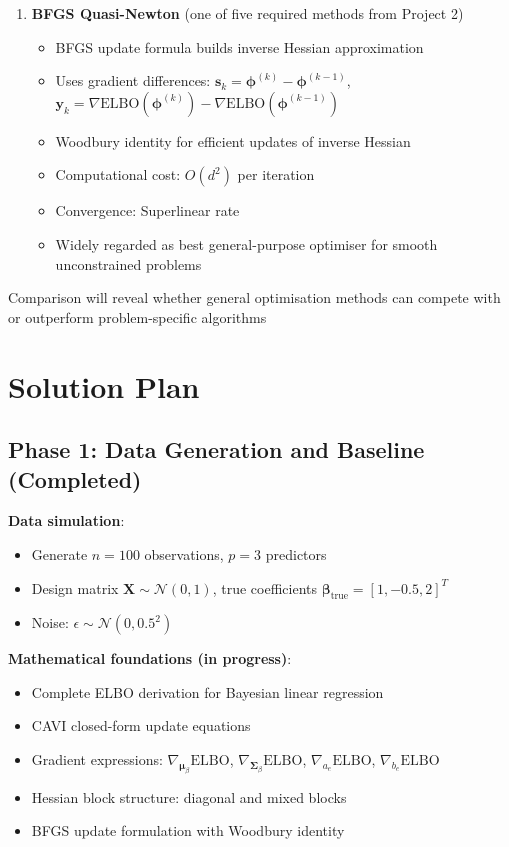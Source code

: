 \documentclass[11pt]{article}
\newcommand{\N}{\mathcal{N}}
\newcommand{\ELBO}{\text{ELBO}}
\begin{document}
\begin{enumerate}[leftmargin=*]
\item \textbf{BFGS Quasi-Newton} (one of five required methods from Project 2)
\begin{itemize}
\item BFGS update formula builds inverse Hessian approximation
\item Uses gradient differences: $\bm{s}_k = \bm{\phi}^{(k)} - \bm{\phi}^{(k-1)}$, $\bm{y}_k = \nabla \ELBO(\bm{\phi}^{(k)}) - \nabla \ELBO(\bm{\phi}^{(k-1)})$
\item Woodbury identity for efficient updates of inverse Hessian
\item Computational cost: $O(d^2)$ per iteration
\item Convergence: Superlinear rate
\item Widely regarded as best general-purpose optimiser for smooth unconstrained problems
\end{itemize}
\end{enumerate}


Comparison will reveal whether general optimisation methods can compete with or outperform problem-specific algorithms

\section*{Solution Plan}

\subsection*{Phase 1: Data Generation and Baseline (Completed)}

\textbf{Data simulation}:
\begin{itemize}
\item Generate $n = 100$ observations, $p = 3$ predictors
\item Design matrix $\bm{X} \sim \N(0, 1)$, true coefficients $\bm{\beta}_{\text{true}} = [1, -0.5, 2]^T$
\item Noise: $\epsilon \sim \N(0, 0.5^2)$
\end{itemize}

\textbf{Mathematical foundations (in progress)}:
\begin{itemize}
\item Complete ELBO derivation for Bayesian linear regression
\item CAVI closed-form update equations
\item Gradient expressions: $\nabla_{\bm{\mu}_\beta} \ELBO$, $\nabla_{\bm{\Sigma}_\beta} \ELBO$, $\nabla_{a_e} \ELBO$, $\nabla_{b_e} \ELBO$
\item Hessian block structure: diagonal and mixed blocks
\item BFGS update formulation with Woodbury identity
\end{itemize}
\end{document}
